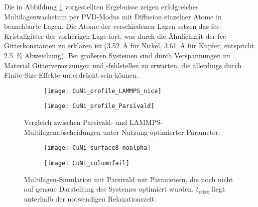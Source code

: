 Die in Abbildung \ref{fig:multilayerresults} vorgestellten Ergebnisse zeigen erfolgreiches Multilagenwachstum per PVD-Modus mit Diffusion einzelner Atome in benachbarte Lagen.
Die Atome der verschiedenen Lagen setzen das fcc-Kristallgitter der vorherigen Lage fort, was durch die Ähnlichkeit der fcc-Gitterkonstanten zu erklären ist (\SI{3.52}{\angstrom} für Nickel, \SI{3.61}{\angstrom} für Kupfer, entspricht \SI{2.5}{\percent} Abweichung).
Bei größeren Systemen sind durch Verspannungen im Material Gitterversetzungen und -fehlstellen zu erwarten, die allerdings durch Finite-Size-Effekte unterdrückt sein können.

\begin{figure}
  \captionsetup[subfigure]{singlelinecheck=false}
  \def\subfigwidth{7cm}
  \begin{subfigure}[t]{\subfigwidth}
    \texttt{[image: CuNi\_profile\_LAMMPS\_nice]}
  \end{subfigure}
  \hfill
  \begin{subfigure}[t]{\subfigwidth}
    \texttt{[image: CuNi\_profile\_Parsivald]}
  \end{subfigure}
  \caption[Vergleich zwischen Parsivald- und LAMMPS-Multilagenabscheidungen]{
    Vergleich zwischen Parsivald- und LAMMPS-Multilagenabscheidungen unter Nutzung optimierter Parameter.
  }
  \label{fig:multilayerresults}
\end{figure}

\begin{figure}
  \captionsetup[subfigure]{singlelinecheck=false}
  \begin{subfigure}[t]{8cm}
    \texttt{[image: CuNi\_surface8\_noalpha]}
  \end{subfigure}
  \hfill
  \begin{subfigure}[t]{6cm}
    \texttt{[image: CuNi\_columnfail]}
  \end{subfigure}
  \caption[Multilagen-Simulation mit willkürlichen Parametern]{
    Multilagen-Simulation mit Parsivald mit Parametern, die noch nicht auf genaue Darstellung des Systemes optimiert wurden.
    $t_\text{relax}$ liegt unterhalb der notwendigen Relaxationszeit.
  }
  \label{fig:multilayerfails}
\end{figure}
